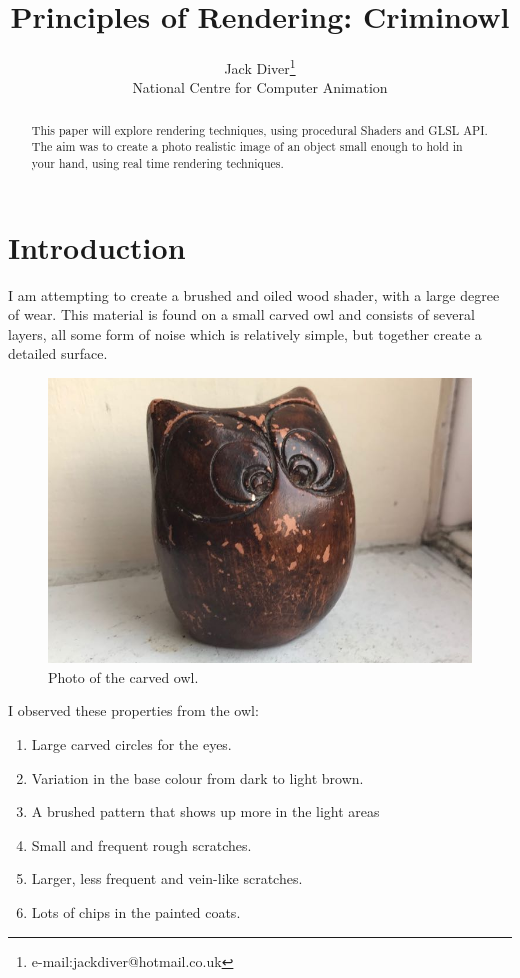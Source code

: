 \documentclass[]{acmsiggraph}
\title{Principles of Rendering: Criminowl}
\author{Jack Diver\thanks{e-mail:jackdiver@hotmail.co.uk}\\National Centre for Computer Animation}
\begin{document}
\maketitle


\begin{abstract}
This paper will explore rendering techniques, using procedural Shaders and GLSL API. The aim was to create a photo realistic image of an object small enough to hold in your hand, using real time rendering techniques.
\end{abstract}

\section{Introduction} \label{sec:introduction}
I am attempting to create a brushed and oiled wood shader, with a large degree of wear. This material is found on a small carved owl and consists of several layers, all some form of noise which is relatively simple, but together create a detailed surface. 

\begin{figure}[htbp]\centering
 \includegraphics[width=0.7\linewidth]{images/real.png}
 \caption{\label{fig:reference}Photo of the carved owl.}
\end{figure}

I observed these properties from the owl:
\begin{enumerate}
 \item Large carved circles for the eyes.
 \item Variation in the base colour from dark to light brown.
 \item A brushed pattern that shows up more in the light areas
 \item Small and frequent rough scratches.
 \item Larger, less frequent and vein-like scratches.
 \item Lots of chips in the painted coats.
\end{enumerate}
\end{document}
